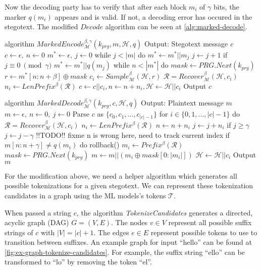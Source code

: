 Now the decoding party has to verify that after each block $m_i$ of $\gamma$ bits, the marker $q(m_i)$ appears and is valid.
If not, a decoding error has occured in the stegotext.
The modified $Decode$ algorithm can be seen at \autoref{alg:marked-decode}.

\begin{Pseudocode}[float, caption={Marked Encode Algorithm}, label={alg:marked-encode}]
algorithm $MarkedEncode_{\mathcal{M}}^{\beta, \gamma}(k_{prg}, m, \mathcal{H}, q)$
	Output: Stegotext message $c$
	$c \leftarrow \epsilon,~ n \leftarrow 0$
	$m^* \leftarrow \epsilon,~ j \leftarrow 0$
	while $j < |m|$ do
		$m^* \leftarrow m^* || m_j$
		$j \leftarrow j + 1$
		if $j \equiv 0~ \pmod \gamma$
			$m^* \leftarrow m^* || q(m_j)$
	while $n < |m^*|$ do
		$mask \leftarrow PRG.Next(k_{prg})$
		$r \leftarrow m^*[n:n+\beta] \oplus mask$
		$c_i \leftarrow Sample_{\mathcal{M}}^\beta(\mathcal{H}, r)$
		$\mathcal{R} = Recover_{\mathcal{M}}^\beta(\mathcal{H}, c_i)$
		$n_i \leftarrow LenPrefix^\beta(\mathcal{R})$
		$c \leftarrow c || c_i, n \leftarrow n+n_i, \mathcal{H} \leftarrow \mathcal{H}||c_i$
	Output $c$
\end{Pseudocode}



\begin{Pseudocode}[float, caption={Marked Decode Algorithm}, label={alg:marked-decode}]
algorithm $MarkedDecode_{\mathcal{M}}^{\beta,\gamma}(k_{prg}, c, \mathcal{H}, q)$
	Output: Plaintext message $m$
	$m \leftarrow \epsilon,~ n \leftarrow 0,~ j \leftarrow 0$
	Parse $c$ as $\{ c_0, c_1, \dots, c_{|c|-1} \}$
	for $i \in \{0, 1, \dots, |c|-1 \}$ do
		$\mathcal{R} = Recover_{\mathcal{M}}^\beta(\mathcal{H}, c_i)$
		$n_i \leftarrow LenPrefix^\beta(\mathcal{R})$
		$n \leftarrow n + n_i$
		$j \leftarrow j + n_i$
		if $j \geq \gamma$
			$j \leftarrow j - \gamma$
			!!TODO!! fixme n is wrong here, need to track current index
			if $m[n:n+\gamma] \neq q(m_i)$ do
				rollback()
		$m_i \leftarrow Prefix^\beta(\mathcal{R})$
		$mask \leftarrow PRG.Next(k_{prg})$
		$m \leftarrow m || (m_i \oplus mask[0: |m_i|])$
		$\mathcal{H} \leftarrow \mathcal{H}||c_i$
	Output $m$
\end{Pseudocode}

For the modification above, we need a helper algorithm which generates all possible tokenizations for a given stegotext.
We can represent these tokenization candidates in a graph using the ML models's tokens $\mathcal{T}$.

When passed a string $c$, the algorithm \emph{TokenizeCandidates} generates a directed, acyclic graph (DAG) $G = (V, E)$.
The nodes $v \in V$ represent all possible suffix strings of $c$ with $|V| = |c| + 1$.
The edges $e \in E$ represent possible tokens to use to transition between suffixes.
An example graph for input ``hello'' can be found at \ref{fig:ex-graph-tokenize-candidates}.
For example, the suffix string ``ello'' can be transformed to ``lo'' by removing the token ``el''.

